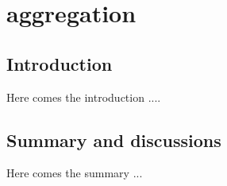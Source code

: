 \chapter{aggregation}
\label{chap:aggregation}



\section{Introduction}

Here comes the introduction \cite{appPS1KImouseModelRevIntraneuronalAbeta}....


\section{Summary and discussions}

Here comes the summary ... 

\endinput
